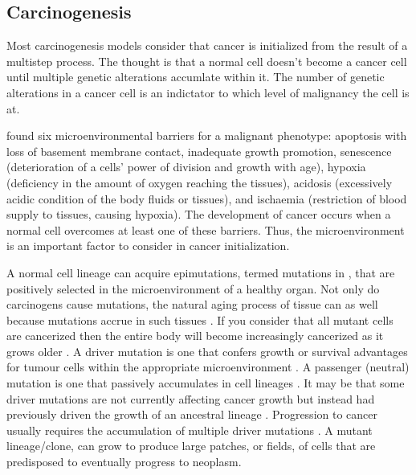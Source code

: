 \documentclass[\main/thesis.tex]{subfiles}
\begin{document}
\subsection{Carcinogenesis}

Most carcinogenesis models consider that cancer is initialized from the result 
of a multistep process. The thought is that a normal cell doesn't become a 
cancer cell until multiple genetic alterations accumlate within it. The number 
of genetic alterations in a cancer cell is an indictator to which level of 
malignancy the cell is at. 

\textcite{Gatenby} found six microenvironmental barriers for a 
malignant phenotype: apoptosis with loss of basement membrane contact, 
inadequate growth promotion, senescence (deterioration of a cells' power of 
division and growth with age), hypoxia (deficiency in the amount of oxygen 
reaching the tissues), acidosis (excessively acidic condition of the body fluids 
or tissues), and ischaemia (restriction of blood supply to tissues, causing 
hypoxia). The development of cancer occurs when a normal cell overcomes at least 
one of these barriers. Thus, the microenvironment is an important factor to 
consider in cancer initialization. 

A normal cell lineage can acquire epimutations, termed mutations in 
\textcite{Curtius}, that are positively selected in the microenvironment of a 
healthy organ. Not only do carcinogens cause mutations, the natural aging 
process of tissue can as well because mutations accrue in such tissues 
\parencite{Blokzijl}. If you consider that all mutant cells are cancerized then 
the entire body will become increasingly cancerized as it grows older 
\parencite{Curtius}. A driver mutation is one that confers growth or survival 
advantages for tumour cells within the appropriate microenvironment 
\parencite{Calabrese,MGreaves,Stratton}. A passenger (neutral) mutation is one 
that passively accumulates in cell lineages 
\parencite{Calabrese,MGreaves,Stratton}. It may be that some driver mutations 
are not currently affecting cancer growth but instead had previously driven the 
growth of an ancestral lineage \parencite{Curtius}. Progression to cancer 
usually requires the accumulation of multiple driver mutations 
\parencite{Weaver}. A mutant lineage/clone, can grow to produce large patches, 
or fields, of cells that are predisposed to eventually progress to neoplasm. 
\end{document}
